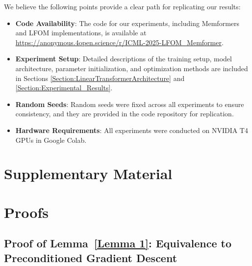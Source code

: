 \documentclass[11pt]{article}
\theoremstyle{plain}
\theoremstyle{definition}
\theoremstyle{remark}
\numberwithin{equation}{section}
\begin{document}
We believe the following points provide a clear path for replicating our results:

\begin{itemize}
    \item \textbf{Code Availability}: The code for our experiments, including Memformers and LFOM implementations, is available at \url{https://anonymous.4open.science/r/ICML-2025-LFOM_Memformer}.
    
    \item \textbf{Experiment Setup}: Detailed descriptions of the training setup, model architecture, parameter initialization, and optimization methods are included in Sections \ref{Section:LinearTransformerArchitecture} and \ref{Section:Experimental_Results}.
    
    \item \textbf{Random Seeds}: Random seeds were fixed across all experiments to ensure consistency, and they are provided in the code repository for replication.
    
    \item \textbf{Hardware Requirements}: All experiments were conducted on NVIDIA T4 GPUs in Google Colab.
\end{itemize}


\setlength{\bibsep}{3pt}


\newpage
\appendix
\onecolumn

\section*{Supplementary Material}
\appendix

\section{Proofs}
\subsection{Proof of Lemma~\ref{Lemma 1}: Equivalence to Preconditioned Gradient Descent}
\label{Proof of Lemma 1}
\end{document}
